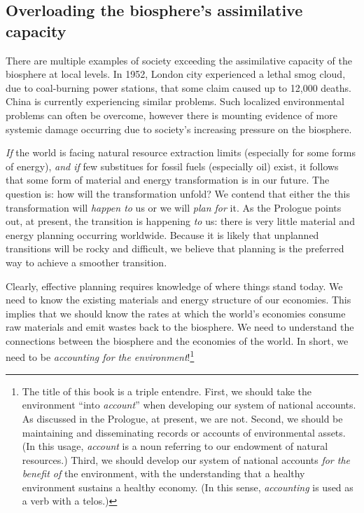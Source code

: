 \subsection{Overloading the biosphere's assimilative capacity}

There are multiple examples of society exceeding 
the assimilative capacity of the biosphere at local levels.
In 1952, London city experienced a lethal smog cloud,
due to coal-burning power stations,
that some claim caused up to 12,000 deaths.~\cite{Davis2002, Bell2004}
China is currently experiencing similar problems.
Such localized environmental problems can often be overcome,
however there is mounting evidence of more systemic
damage occurring due to society's increasing pressure on
the biosphere.~\cite{MEA2005, Ewing2008}

\emph{If} the world is facing natural resource extraction limits
(especially for some forms of energy), 
\emph{and if} few substitues for fossil fuels (especially oil) exist,
it follows that some form of material and energy transformation is in our future.
The question is: how will the transformation unfold?
We contend that either the this transformation 
will \emph{happen to} us or we will \emph{plan for} it.
As the Prologue points out, at present, the transition is happening \emph{to} us:
there is very little material and energy planning occurring worldwide.
Because it is likely that unplanned transitions will be rocky and difficult,
we believe that planning is the preferred way to achieve a smoother transition.

Clearly, effective planning requires knowledge of where things stand today.
We need to know the existing materials and energy structure of our economies. 
This implies that we should know the rates at which 
the world's economies consume raw materials and emit wastes back to the biosphere.
We need to understand the connections between the biosphere and the economies of the world.
In short, we need to be \emph{accounting for the environment}!\footnote{The title 
	of this book is a triple entendre.
	First, we should take the environment ``into \emph{account}''
		when developing our system of national accounts.
		As discussed in the Prologue, at present, we are not.
	Second, we should be maintaining and disseminating
		records or accounts of environmental assets. 
		(In this usage, \emph{account} is a noun
		referring to our endowment of natural resources.)
	Third, we should develop our system of national accounts 
		\emph{for the benefit of} the environment, 
		with the understanding 
		that a healthy environment sustains a healthy economy.
		(In this sense, \emph{accounting} is used as a verb with a telos.)}

